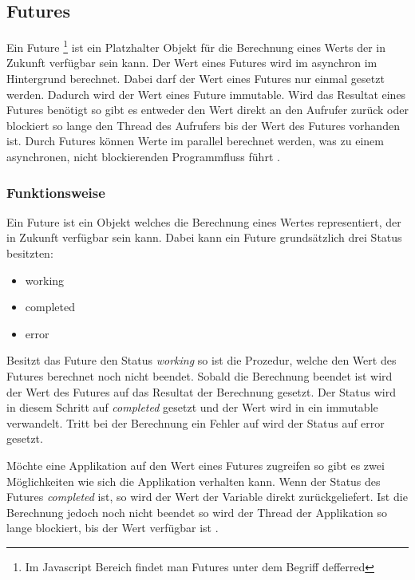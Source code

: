 \subsection{Futures}

Ein Future \footnote{Im Javascript Bereich findet man Futures unter dem Begriff defferred} ist ein Platzhalter Objekt für die Berechnung eines Werts der in Zukunft verfügbar sein kann. Der Wert eines Futures wird im asynchron im Hintergrund berechnet. Dabei darf der Wert eines Futures nur einmal gesetzt werden. Dadurch wird der Wert eines Future immutable. Wird das Resultat eines Futures benötigt so gibt es entweder den Wert direkt an den Aufrufer zurück oder blockiert so lange den Thread des Aufrufers bis der Wert des Futures vorhanden ist. Durch Futures können Werte im parallel berechnet werden, was zu einem asynchronen, nicht blockierenden Programmfluss führt \cite[]{ScalaFutures}. 

\subsubsection{Funktionsweise} 

Ein Future ist ein Objekt welches die Berechnung eines Wertes representiert, der in Zukunft verfügbar sein kann. Dabei kann ein Future grundsätzlich drei Status besitzten: 

\begin{itemize}
  \item working
  \item completed
  \item error
\end{itemize}  

Besitzt das Future den Status \emph{working} so ist die Prozedur, welche den Wert des Futures berechnet noch nicht beendet. Sobald die Berechnung beendet ist wird der Wert des Futures auf das Resultat der Berechnung gesetzt. Der Status wird in diesem Schritt auf \emph{completed} gesetzt und der Wert wird in ein immutable verwandelt. Tritt bei der Berechnung ein Fehler auf wird der Status auf error gesetzt. 

Möchte eine Applikation auf den Wert eines Futures zugreifen so gibt es zwei Möglichkeiten wie sich die Applikation verhalten kann. Wenn der Status des Futures \emph{completed} ist, so wird der Wert der Variable direkt zurückgeliefert. Ist die Berechnung jedoch noch nicht beendet so wird der Thread der Applikation so lange blockiert, bis der Wert verfügbar ist \cite[]{ScalaFutures}.

